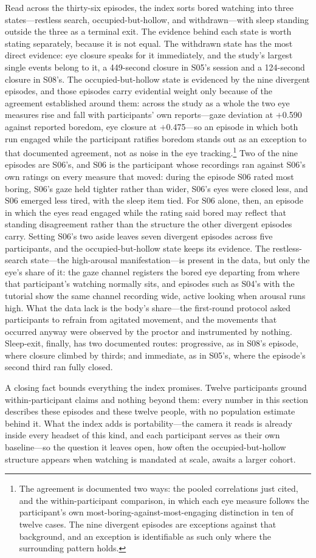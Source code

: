Read across the thirty-six episodes, the index sorts bored watching into three
states---restless search, occupied-but-hollow, and withdrawn---with sleep standing outside
the three as a terminal exit. The evidence behind each state is worth stating separately,
because it is not equal. The withdrawn state has the most direct evidence: eye closure speaks
for it immediately, and the study's largest single events belong to it, a 449-second closure
in S05's session and a 124-second closure in S08's. The occupied-but-hollow state is
evidenced by the nine divergent episodes, and those episodes carry evidential weight only
because of the agreement established around them: across the study as a whole the two eye
measures rise and fall with participants' own reports---gaze deviation at $+$0.590 against
reported boredom, eye closure at $+$0.475---so an episode in which both run engaged while the
participant ratifies boredom stands out as an exception to that documented agreement, not as
noise in the eye tracking.\footnote{The agreement is documented two ways: the pooled
correlations just cited, and the within-participant comparison, in which each eye measure
follows the participant's own most-boring-against-most-engaging distinction in ten of twelve
cases. The nine divergent episodes are exceptions against that background, and an exception
is identifiable as such only where the surrounding pattern holds.} Two of the nine episodes
are S06's, and S06 is the participant whose recordings ran against S06's own ratings on every
measure that moved: during the episode S06 rated most boring, S06's gaze held tighter rather
than wider, S06's eyes were closed less, and S06 emerged less tired, with the sleep item tied.
For S06 alone, then, an episode in which the eyes read engaged while the rating said bored may
reflect that standing disagreement rather than the structure the other divergent episodes
carry. Setting S06's two aside leaves seven divergent episodes across five participants, and
the occupied-but-hollow state keeps its evidence. The restless-search state---the
high-arousal manifestation---is present in the data, but only the eye's share of it: the gaze
channel registers the bored eye departing from where that participant's watching normally
sits, and episodes such as S04's with the tutorial show the same channel recording wide,
active looking when arousal runs high. What the data lack is the body's share---the
first-round protocol asked participants to refrain from agitated movement, and the movements
that occurred anyway were observed by the proctor and instrumented by nothing. Sleep-exit,
finally, has two documented routes: progressive, as in S08's episode, where closure climbed
by thirds; and immediate, as in S05's, where the episode's second third ran fully closed.

A closing fact bounds everything the index promises. Twelve participants ground
within-participant claims and nothing beyond them: every number in this section describes
these episodes and these twelve people, with no population estimate behind it. What the index
adds is portability---the camera it reads is already inside every headset of this kind, and
each participant serves as their own baseline---so the question it leaves open, how often the
occupied-but-hollow structure appears when watching is mandated at scale, awaits a larger
cohort.
